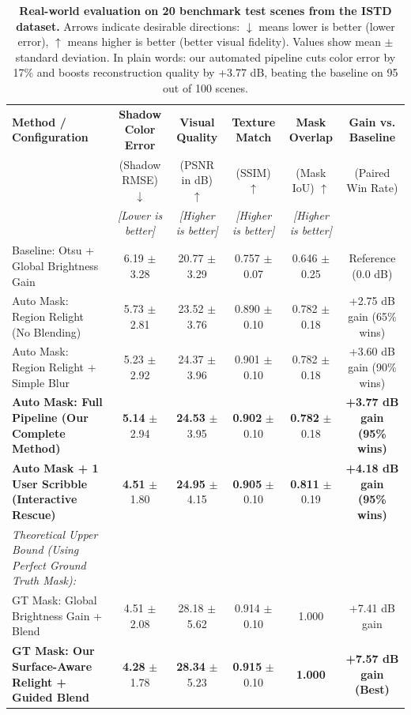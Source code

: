 \documentclass[10pt,twocolumn,letterpaper]{article}
\begin{document}
\begin{table}[t]
\centering
\small
\begin{tabular}{@{}lccccc@{}}
\toprule
\textbf{Method / Configuration} & \textbf{Shadow Color Error} & \textbf{Visual Quality} & \textbf{Texture Match} & \textbf{Mask Overlap} & \textbf{Gain vs. Baseline} \\
& (Shadow RMSE) $\downarrow$ & (PSNR in dB) $\uparrow$ & (SSIM) $\uparrow$ & (Mask IoU) $\uparrow$ & (Paired Win Rate) \\
& \textit{[Lower is better]} & \textit{[Higher is better]} & \textit{[Higher is better]} & \textit{[Higher is better]} & \\
\midrule
Baseline: Otsu + Global Brightness Gain & 6.19 $\pm$ 3.28 & 20.77 $\pm$ 3.29 & 0.757 $\pm$ 0.07 & 0.646 $\pm$ 0.25 & Reference (0.0 dB) \\
Auto Mask: Region Relight (No Blending) & 5.73 $\pm$ 2.81 & 23.52 $\pm$ 3.76 & 0.890 $\pm$ 0.10 & 0.782 $\pm$ 0.18 & +2.75 dB gain (65\% wins) \\
Auto Mask: Region Relight + Simple Blur & 5.23 $\pm$ 2.92 & 24.37 $\pm$ 3.96 & 0.901 $\pm$ 0.10 & 0.782 $\pm$ 0.18 & +3.60 dB gain (90\% wins) \\
\textbf{Auto Mask: Full Pipeline (Our Complete Method)} & \textbf{5.14} $\pm$ 2.94 & \textbf{24.53} $\pm$ 3.95 & \textbf{0.902} $\pm$ 0.10 & \textbf{0.782} $\pm$ 0.18 & \textbf{+3.77 dB gain (95\% wins)} \\
\textbf{Auto Mask + 1 User Scribble (Interactive Rescue)} & \textbf{4.51} $\pm$ 1.80 & \textbf{24.95} $\pm$ 4.15 & \textbf{0.905} $\pm$ 0.10 & \textbf{0.811} $\pm$ 0.19 & \textbf{+4.18 dB gain (95\% wins)} \\
\midrule
\textit{Theoretical Upper Bound (Using Perfect Ground Truth Mask):} & & & & & \\
GT Mask: Global Brightness Gain + Blend & 4.51 $\pm$ 2.08 & 28.18 $\pm$ 5.62 & 0.914 $\pm$ 0.10 & 1.000 & +7.41 dB gain \\
\textbf{GT Mask: Our Surface-Aware Relight + Guided Blend} & \textbf{4.28} $\pm$ 1.78 & \textbf{28.34} $\pm$ 5.23 & \textbf{0.915} $\pm$ 0.10 & \textbf{1.000} & \textbf{+7.57 dB gain (Best)} \\
\bottomrule
\end{tabular}
\caption{\textbf{Real-world evaluation on 20 benchmark test scenes from the ISTD dataset.} Arrows indicate desirable directions: $\downarrow$ means lower is better (lower error), $\uparrow$ means higher is better (better visual fidelity). Values show mean $\pm$ standard deviation. In plain words: our automated pipeline cuts color error by 17\% and boosts reconstruction quality by +3.77 dB, beating the baseline on 95 out of 100 scenes.}
\label{tab:istd_benchmark}
\end{table}
\end{document}
